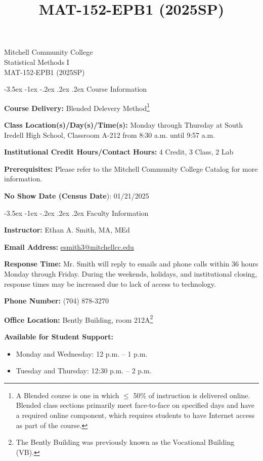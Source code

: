 \documentclass{article}
\title{MAT-152-EPB1 (2025SP)}
\makeatletter
\renewcommand\section{\@startsection{section}{1}{0pt}%
  {-3.5ex \@plus -1ex \@minus -.2ex}%
  {.2ex \@plus.2ex}%
  {\normalfont\Large\bfseries}} %
\makeatother
\begin{document}
\begin{center}
    {\huge Mitchell Community College} \\[6pt]
    {\Large Statistical Methods I} \\[6pt]
    {\Large MAT-152-EPB1 (2025SP)}
\end{center}

\section{Course Information}

\textbf{Course Delivery:} Blended Delevery Method\footnote{A Blended course is one in which $\leq$ 50\% of instruction is delivered online. Blended class sections primarily meet face-to-face on specified days and have a required online component, which requires students to have Internet access as part of the course.}

\textbf{Class Location(s)/Day(s)/Time(s):} Monday through Thursday at South Iredell High School, Classroom A-212 from 8:30 a.m. until 9:57 a.m.

\textbf{Institutional Credit Hours/Contact Hours:} 4 Credit, 3 Class, 2 Lab

\textbf{Prerequisites:} Please refer to the Mitchell Community College Catalog for more information.

\textbf{No Show Date (Census Date}): 01/21/2025

\section{Faculty Information}

\textbf{Instructor:} Ethan A. Smith, MA, MEd

\textbf{Email Address:} \href{mailto:esmith3@mitchellcc.edu}{esmith3@mitchellcc.edu}

\textbf{Response Time:} Mr. Smith will reply to emails and phone calls within 36 hours Monday through Friday. During the weekends, holidays, and institutional closing, response times may be increased due to lack of access to technology.

\textbf{Phone Number:} (704) 878-3270

\textbf{Office Location:} Bently Building, room 212A\footnote{The Bently Building was previously known as the Vocational Building (VB).}

\textbf{Available for Student Support:}

\begin{itemize}
\item Monday and Wednesday: 12 p.m. -- 1 p.m.
\item Tuesday and Thursday: 12:30 p.m. -- 2 p.m.
\end{itemize}
\end{document}
